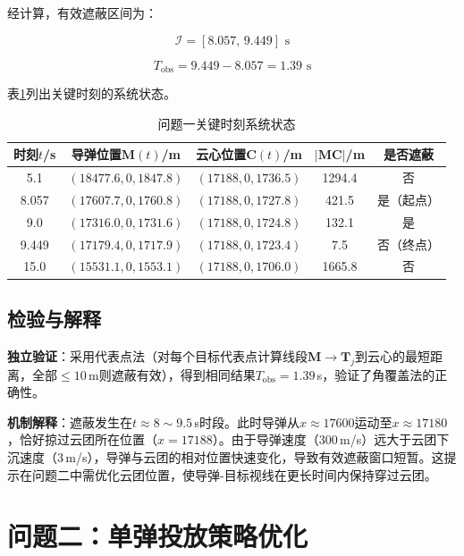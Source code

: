 \documentclass[a4paper]{ctexart}
\newcommand{\bm}[1]{\boldsymbol{#1}}
\begin{document}
经计算，有效遮蔽区间为：

\begin{equation}
\mathcal{I} = [8.057,\, 9.449] \text{ s}
\end{equation}

\begin{equation}
T_{\text{obs}} = 9.449 - 8.057 = \boxed{1.39 \text{ s}}
\end{equation}

表\ref{tab:q1_keypoints}列出关键时刻的系统状态。

\begin{table}[H]
\centering
{}
\caption{问题一关键时刻系统状态}
\label{tab:q1_keypoints}
\begin{tabular}{c|c|c|c|c}
\toprule
时刻$t$/s & 导弹位置$\bm{M}(t)$/m & 云心位置$\bm{C}(t)$/m & $|\bm{MC}|$/m & 是否遮蔽 \\
\midrule
5.1 & $(18477.6, 0, 1847.8)$ & $(17188, 0, 1736.5)$ & 1294.4 & 否 \\
8.057 & $(17607.7, 0, 1760.8)$ & $(17188, 0, 1727.8)$ & 421.5 & 是（起点） \\
9.0 & $(17316.0, 0, 1731.6)$ & $(17188, 0, 1724.8)$ & 132.1 & 是 \\
9.449 & $(17179.4, 0, 1717.9)$ & $(17188, 0, 1723.4)$ & 7.5 & 否（终点） \\
15.0 & $(15531.1, 0, 1553.1)$ & $(17188, 0, 1706.0)$ & 1665.8 & 否 \\
\bottomrule
\end{tabular}
\end{table}

\subsection{检验与解释}

\textbf{独立验证}：采用代表点法（对每个目标代表点计算线段$\bm{M}\to\bm{T}_j$到云心的最短距离，全部$\leq 10$\,m则遮蔽有效），得到相同结果$T_{\text{obs}} = 1.39$\,s，验证了角覆盖法的正确性。

\textbf{机制解释}：遮蔽发生在$t \approx 8\sim 9.5$\,s时段。此时导弹从$x \approx 17600$运动至$x \approx 17180$，恰好掠过云团所在位置（$x = 17188$）。由于导弹速度（300\,m/s）远大于云团下沉速度（3\,m/s），导弹与云团的相对位置快速变化，导致有效遮蔽窗口短暂。这提示在问题二中需优化云团位置，使导弹-目标视线在更长时间内保持穿过云团。

\section{问题二：单弹投放策略优化}
\end{document}
